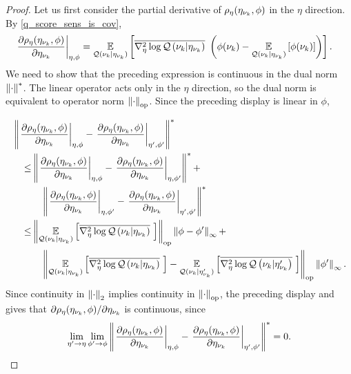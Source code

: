 \begin{proof}
Let us first consider the partial derivative of $\rho_\eta(\eta_{\nu_{k}}, \phi)$ in
the $\eta$ direction. By  \eqref{q_score_sens_is_cov},
%
\begin{align*}
%
\fracat{\partial \rho_\eta(\etanuk, \phi)}{\partial \etanuk}{\eta, \phi} ={}&
\expect{\q(\nuk \vert \etanuk)}{
   \lqhessbar{\nuk \vert \etanuk}
       \left(
        \phi(\nuk) - \expect{\q(\nuk \vert \etanuk)}{\phi(\nuk)}
       \right)
       }.
%
\end{align*}
%
We need to show that the preceding expression is continuous in the dual norm
$\left\Vert\cdot\right\Vert^*$.  The linear operator acts only in the $\eta$ direction, so
the dual norm is equivalent to operator norm $\left\Vert\cdot\right\Vert_{\mathrm{op}}$.  Since
the preceding display is linear in $\phi$,

%
\begin{align*}
%
\MoveEqLeft
%
\norm{\fracat{\partial \rho_\eta(\etanuk, \phi)}{\partial \etanuk}{\eta, \phi} -
      \fracat{\partial \rho_\eta(\etanuk, \phi)}{\partial \etanuk}{\eta', \phi'}
      }^* \\ \le
%
& \norm{\fracat{\partial \rho_\eta(\etanuk, \phi)}{\partial \etanuk}{\eta, \phi} -
        \fracat{\partial \rho_\eta(\etanuk, \phi)}{\partial \etanuk}{\eta, \phi'}
    }^* + \\&\quad
\norm{\fracat{\partial \rho_\eta(\etanuk, \phi)}{\partial \etanuk}{\eta, \phi'} -
      \fracat{\partial \rho_\eta(\etanuk, \phi)}{\partial \etanuk}{\eta', \phi'}
    }^* \\ \le
%
& \normop{
    \expect{\q(\nuk \vert \etanuk)}
           {\lqhessbar{\nuk \vert \etanuk}}
    } \norminf{\phi - \phi'} + \\&\quad
\normop{
    \expect{\q(\nuk \vert \etanuk)}{\lqhessbar{\nuk \vert \etanuk}} -
    \expect{\q(\nuk \vert \etanuk')}{\lqhessbar{\nuk \vert \etanuk'}}
  } \norminf{\phi'}.
%
\end{align*}
%
Since continuity in $\left\Vert\cdot\right\Vert_2$ implies continuity in $\left\Vert\cdot\right\Vert_{\mathrm{op}}$,
the preceding display and  gives that
$\partial \rho_\eta(\eta_{\nu_{k}}, \phi) / \partial \eta_{\nu_{k}}$ is continuous,
since
%
\begin{align*}
%
\lim_{\eta' \rightarrow \eta} \lim_{\phi' \rightarrow \phi}
\norm{\fracat{\partial \rho_\eta(\etanuk, \phi)}{\partial \etanuk}{\eta, \phi} -
      \fracat{\partial \rho_\eta(\etanuk, \phi)}{\partial \etanuk}{\eta', \phi'}
      }^* = 0.
%
\end{align*}


\end{proof}
